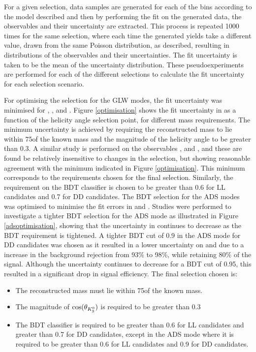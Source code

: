 For a given selection, data samples are generated for each of the bins according to the model described and then by performing the \CP fit on the generated data, the \CP observables and their uncertainty are extracted. This process is repeated 1000 times for the same selection, where each time the generated yields take a different value, drawn from the same Poisson distribution, as described, resulting in distributions of the \CP observables and their uncertainties. The fit uncertainty is taken to be the mean of the uncertainty distribution. These pseudoexperiments are performed for each of the different selections to calculate the fit uncertainty for each selection scenario.  

For optimising the selection for the GLW modes, the fit uncertainty was minimised for \Akk, \Rkk, \Apipi and \Rpipi. Figure \ref{optimisation} shows the fit uncertainty in \Rkk as a function of the \KS helicity angle selection point, for different \Kstarm mass requirements. The minimum uncertainty is achieved by requiring the reconstructed \Kstarm mass to lie within 75\mevcc of the known \Kstarm mass and the magnitude of the \KS helicity angle to be greater than 0.3. A similar study is performed on the \CP observables \Akk, \Apipi and \Rpipi, and these are found be relatively insensitive to changes in the selection, but showing reasonable agreement with the minimum indicated in Figure \ref{optimisation}. This minimum corresponds to the \Kstarm requirements chosen for the final selection. Similarly, the requirement on the BDT classifier is chosen to be greater than 0.6 for LL candidates and 0.7 for DD candidates. The BDT selection for the ADS modes was optimised to minimise the fit errors in \Rptwo and \Rmtwo. Studies were performed to investigate a tighter BDT selection for the ADS mode as illustrated in Figure \ref{adsoptimisation}, showing that the uncertainty in \Rptwo continues to decrease as the BDT requirement is tightened. A tighter BDT cut of 0.9 in the ADS mode for DD candidates was chosen as it resulted in a lower uncertainty on \Rptwo and \Rmtwo due to a increase in the background rejection from 93\% to 98\%, while retaining 80\% of the signal. Although the uncertainty continues to decrease for a BDT cut of 0.95, this resulted in a significant drop in signal efficiency. The final selection chosen is:

\begin{itemize}
\item{The reconstructed \Kstarm mass must lie within 75\mev of the known \Kstarm mass.}
\item{The magnitude of $\cos(\theta_{{{K}^0_{\mathrm{ \scriptscriptstyle S}}}})$ is required to be greater than 0.3}
\item{The BDT classifier is required to be greater than 0.6 for LL candidates and greater than 0.7 for DD candidates, except in the ADS mode where it is required to be greater than 0.6 for LL candidates and 0.9 for DD candidates.}
\end{itemize}

